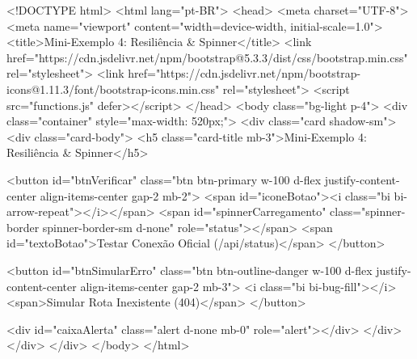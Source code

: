 \begin{boxCodigoHTML}[]
<!DOCTYPE html>
<html lang="pt-BR">
<head>
  <meta charset="UTF-8">
  <meta name="viewport" content="width=device-width, initial-scale=1.0">
  <title>Mini-Exemplo 4: Resiliência & Spinner</title>
  <link
    href="https://cdn.jsdelivr.net/npm/bootstrap@5.3.3/dist/css/bootstrap.min.css"
    rel="stylesheet">
  <link
    href="https://cdn.jsdelivr.net/npm/bootstrap-icons@1.11.3/font/bootstrap-icons.min.css"
    rel="stylesheet">
  <script src="functions.js" defer></script>
</head>
<body class="bg-light p-4">
  <div class="container" style="max-width: 520px;">
    <div class="card shadow-sm">
      <div class="card-body">
        <h5 class="card-title mb-3">Mini-Exemplo 4: Resiliência & Spinner</h5>

        <button
          id="btnVerificar"
          class="btn btn-primary w-100 d-flex justify-content-center align-items-center gap-2 mb-2">
          <span id="iconeBotao"><i class="bi bi-arrow-repeat"></i></span>
          <span id="spinnerCarregamento" class="spinner-border spinner-border-sm d-none" role="status"></span>
          <span id="textoBotao">Testar Conexão Oficial (/api/status)</span>
        </button>

        <button
          id="btnSimularErro"
          class="btn btn-outline-danger w-100 d-flex justify-content-center align-items-center gap-2 mb-3">
          <i class="bi bi-bug-fill"></i>
          <span>Simular Rota Inexistente (404)</span>
        </button>

        <div id="caixaAlerta" class="alert d-none mb-0" role="alert"></div>
      </div>
    </div>
  </div>
</body>
</html>
\end{boxCodigoHTML}


